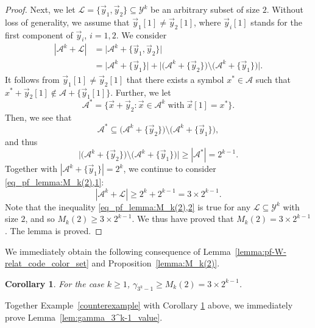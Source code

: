 \documentclass[11pt,draftclsnofoot,onecolumn]{IEEEtran}
\newtheorem{cor}{Corollary}
\begin{document}
\begin{journalonly}
{\begin{proof}
Next, we let $\mathcal{L}=\{\vec{y}_{1},\vec{y}_{2}\}\subseteq\mathcal{Y}^{k}$ be an arbitrary subset of size $2$.
Without loss of generality, we assume that $\vec{y}_{1}[1]\neq \vec{y}_{2}[1]$, where $\vec{y}_{i}[1]$ stands for the first component of $\vec{y}_{i}$, $i=1,2$. We consider
\begin{align}
|\mathcal{A}^{k}+\mathcal{L}|&=\big|\mathcal{A}^{k}+\{\vec{y}_{1},\vec{y}_{2}\}\big|\label{eq_pf_lemma:M_k(2),1}\\
&=\big|\mathcal{A}^{k}+\{\vec{y}_{1}\}\big|
+\big|\big(\mathcal{A}^{k}+\{\vec{y}_{2}\}\big)\setminus\big(\mathcal{A}^{k}+\{\vec{y}_{1}\}\big)\big|.\nonumber
\end{align}
 It follows from $\vec{y}_{1}[1]\neq \vec{y}_{2}[1]$ that there exists a symbol $ x^{*}\in\mathcal{A}$ such that  $x^{*}+\vec{y}_{2}[1]\notin\mathcal{A}+\{\vec{y}_{1}[1]\}$. Further, we let
 \begin{equation}
 \mathcal{A}^{*}=\{ \vec{x}+\vec{y}_{2}:\vec{x}\in\mathcal{A}^{k}\;\text{with}\;\vec{x}[1]=x^{*}\}.
  \end{equation}
  Then, we see that $$\mathcal{A}^{*}\subseteq\big(\mathcal{A}^{k}+\{\vec{y}_{2}\}\big)\setminus\big(\mathcal{A}^{k}+\{\vec{y}_{1}\}\big),$$ and thus \begin{equation}
  \big|\big(\mathcal{A}^{k}+\{\vec{y}_{2}\}\big)\setminus\big(\mathcal{A}^{k}+\{\vec{y}_{1}\}\big)\big|\geq|\mathcal{A}^{*}|=2^{k-1}.
  \end{equation}
   Together with
 $|\mathcal{A}^{k}+\{\vec{y}_{1}\}|=2^{k}$, we continue to consider \eqref{eq_pf_lemma:M_k(2),1}:
 \begin{equation}
 |\mathcal{A}^{k}+\mathcal{L}|\geq 2^{k}+2^{k-1}=3\times 2^{k-1}.\label{eq_pf_lemma:M_k(2),2}
 \end{equation}
 Note that the inequality \eqref{eq_pf_lemma:M_k(2),2} is true for any $\mathcal{L}\subseteq\mathcal{Y}^{k}$ with size $2$, and so $M_{k}(2)\geq 3\times 2^{k-1}.$ We thus have proved that $M_{k}(2)= 3\times 2^{k-1}$.  The lemma is proved.
\end{proof}

We immediately obtain the following consequence of Lemma~\ref{lemma:pf-W-relat_code_color_set} and Proposition~\ref{lemma:M_k(2)}.

\begin{cor}\label{cor:gamma_3^k-1_low_bound}
For the case $k\geq 1$, $\gamma_{3^{k}-1}\geq M_{k}(2)=3\times 2^{k-1}$.
\end{cor}


  Together Example~\ref{counterexample} with Corollary \ref{cor:gamma_3^k-1_low_bound} above, we immediately prove  Lemma~\ref{lem:gamma_3^k-1_value}.




}
\end{journalonly}
\end{document}
